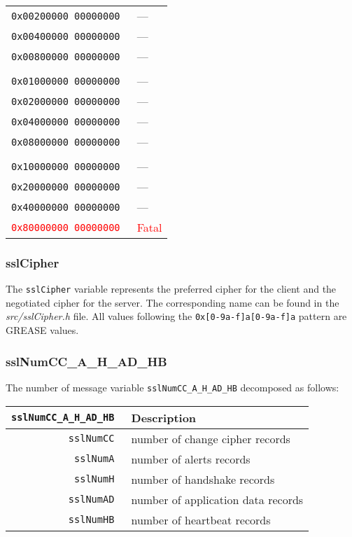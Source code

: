 \documentclass[documentation]{subfiles}
\begin{document}
\begin{minipage}{.48\textwidth}
\begin{longtable}{>{\tt}rl}
                           0x00200000 00000000  & ---\\
                           0x00400000 00000000  & ---\\
                           0x00800000 00000000  & ---\\
        \\
                           0x01000000 00000000  & ---\\
                           0x02000000 00000000  & ---\\
                           0x04000000 00000000  & ---\\
                           0x08000000 00000000  & ---\\
        \\
                           0x10000000 00000000  & ---\\
                           0x20000000 00000000  & ---\\
                           0x40000000 00000000  & ---\\
        \textcolor{red}   {0x80000000 00000000} & \textcolor{red}{Fatal}\\
        \bottomrule
    \end{longtable}
\end{minipage}

\subsubsection{sslCipher}\label{sslCipher}
The {\tt sslCipher} variable represents the preferred cipher for the client and the negotiated cipher for the server. The corresponding name can be found in the {\em src/sslCipher.h} file. All values following the {\tt 0x[0-9a-f]a[0-9a-f]a} pattern are GREASE values.

\subsubsection{sslNumCC\_A\_H\_AD\_HB}\label{sslNumRec}
The number of message variable {\tt sslNumCC\_A\_H\_AD\_HB} decomposed as follows:
\begin{longtable}{>{\tt}rl}
    \toprule
    {\bf sslNumCC\_A\_H\_AD\_HB} & {\bf Description} \\
    \midrule\endhead%
    sslNumCC & number of change cipher records\\
    sslNumA  & number of alerts records\\
    sslNumH  & number of handshake records\\
    sslNumAD & number of application data records\\
    sslNumHB & number of heartbeat records\\
    \bottomrule
\end{longtable}
\end{document}
